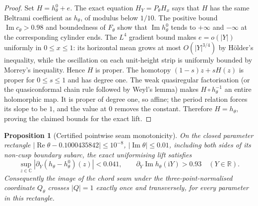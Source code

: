\documentclass[11pt,a4paper]{article}
\newtheorem{proposition}[theorem]{Proposition}
\theoremstyle{definition}
\newcommand{\ii}{\mathrm{i}}
\begin{document}
\begin{proof}
Set $H=h^0_\theta+e$.  The exact equation
$H_Y=P_\theta H_x$ says that $H$ has the same Beltrami
coefficient as $h_\theta$, of modulus below $1/10$.
The positive bound $\operatorname{Im}c_\theta>0.98$ and boundedness
of $F_\theta$ show that $\operatorname{Im}h^0_\theta$ tends to
$+\infty$ and $-\infty$ at the corresponding cylinder ends.
The $L^4$ gradient bound makes $e=o(|Y|)$ uniformly in
$0\le x\le1$: its horizontal mean grows at most
$O(|Y|^{3/4})$ by H\"older's inequality, while the oscillation
on each unit-height strip is uniformly bounded by Morrey's
inequality.  Hence $H$ is proper.  The homotopy
$(1-s)z+sH(z)$ is proper for $0\le s\le1$ and has degree one.
The weak quasiregular factorisation (or the quasiconformal chain
rule followed by Weyl's lemma) makes $H\circ h_\theta^{-1}$
an entire holomorphic map.  It is proper of degree one, so affine;
the period relation forces its slope to be $1$, and the value at
$0$ removes the constant.  Therefore $H=h_\theta$, proving the
claimed bounds for the exact lift.
\end{proof}

\begin{proposition}[Certified pointwise seam monotonicity]
\label{prop:exterior-seam-monotonicity}
On the closed parameter rectangle
$|\operatorname{Re}\theta-0.1000435842|\le10^{-8}$,
$|\operatorname{Im}\theta|\le0.01$, including both sides of its
non-cusp boundary subarc, the exact uniformising lift satisfies
\[
 \sup_{z\in\mathbb C}|\partial_Y(h_\theta-h^0_\theta)(z)|<0.041,
 \qquad
 \partial_Y\operatorname{Im}h_\theta(\ii Y)>0.93
 \quad(Y\in\mathbb R).
\]
Consequently the image of the chord seam under the
three-point-normalised coordinate $Q_\theta$ crosses $|Q|=1$
exactly once and transversely, for every parameter in this
rectangle.
\end{proposition}
\end{document}
